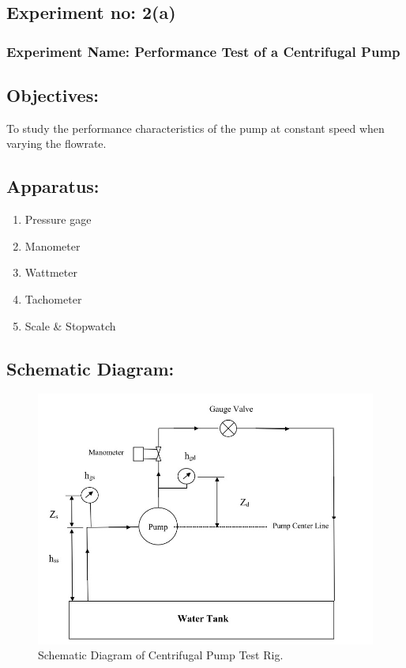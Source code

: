 \documentclass[12pt]{article}
\begin{document}
  \subsection*{Experiment no: 2(a)}
  \subsubsection*{Experiment Name: Performance Test of a Centrifugal Pump} 
  \vspace*{0.3cm}
  \subsection*{Objectives:}
  To study the performance characteristics of the pump at constant speed when varying the flowrate. 
  \vspace*{0.3cm}
  \subsection*{Apparatus:}
  \begin{enumerate}
    \item Pressure gage
    \item Manometer 
    \item Wattmeter
    \item Tachometer 
    \item Scale \& Stopwatch 
  \end{enumerate}  
  
  \vspace*{0.3cm}

  \subsection*{Schematic Diagram:}
  \begin{figure}[h]
    \begin{center}
      \includegraphics*[width=0.80\linewidth]{img/schematic.jpeg}
      \caption{Schematic Diagram of Centrifugal Pump Test Rig.}
    \end{center}
  \end{figure}
\pagebreak
\end{document}
